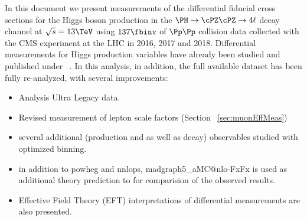 In this document we present measurements of the differential fiducial cross sections for the Higgs boson production in the $\HZZfl$ decay channel at $\sqrt{s}=13\TeV$ using $\usedLumiABC$ of $\Pp\Pp$ collision data collected with the CMS experiment at the LHC in 2016, 2017 and 2018.
Differential measurements for Higgs production variables have already been studied and published under ~\cite{CMS-PAS-HIG-19-001}. In this analysis, in addition, the full available dataset has been fully re-analyzed, with several improvements: 
\begin{itemize}
\item Analysis Ultra Legacy data.
\item Revised measurement of lepton scale factors (Section ~\ref{sec:muonEffMeas}) %
\item several additional (production and as well as decay) observables studied with optimized binning.
\item in addition to {\sc powheg} and {\sc nnlops}, {\sc madgraph5\_aMC@nlo-FxFx} is used as additional theory prediction to for comparision of the observed results.
\item Effective Field Theory (EFT) interpretations of differential measurements are also presented.
\end{itemize}


